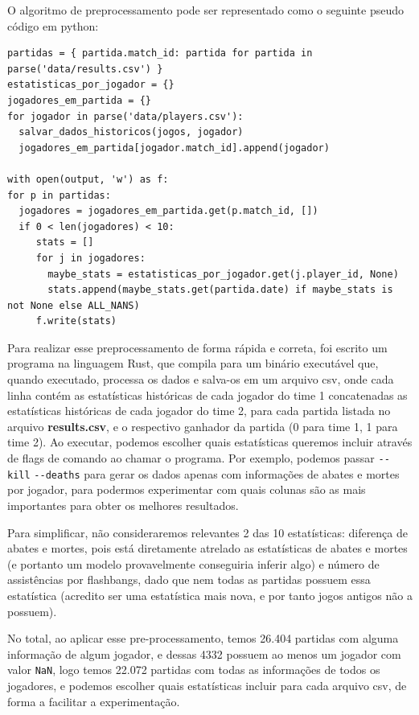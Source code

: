 \documentclass[12pt]{article}
\begin{document}
O algoritmo de preprocessamento pode ser representado como o seguinte pseudo código em python:
\begin{verbatim}
partidas = { partida.match_id: partida for partida in parse('data/results.csv') }
estatisticas_por_jogador = {}
jogadores_em_partida = {}
for jogador in parse('data/players.csv'):
  salvar_dados_historicos(jogos, jogador)
  jogadores_em_partida[jogador.match_id].append(jogador)

with open(output, 'w') as f:
for p in partidas:
  jogadores = jogadores_em_partida.get(p.match_id, [])
  if 0 < len(jogadores) < 10:
     stats = []
     for j in jogadores:
       maybe_stats = estatisticas_por_jogador.get(j.player_id, None)
       stats.append(maybe_stats.get(partida.date) if maybe_stats is not None else ALL_NANS)
     f.write(stats)
\end{verbatim}

Para realizar esse preprocessamento de forma rápida e correta, foi escrito um programa na linguagem Rust, que compila para um binário executável que, quando executado, processa os dados e salva-os em um arquivo csv, onde cada linha contém as estatísticas históricas de cada jogador do time 1 concatenadas as estatísticas históricas de cada jogador do time 2, para cada partida listada no arquivo \textbf{results.csv}, e o respectivo ganhador da partida (0 para time 1, 1 para time 2). Ao executar, podemos escolher quais estatísticas queremos incluir através de flags de comando ao chamar o programa. Por exemplo, podemos passar \verb+--kill+ \verb+--deaths+ para gerar os dados apenas com informações de abates e mortes por jogador, para podermos experimentar com quais colunas são as mais importantes para obter os melhores resultados.

Para simplificar, não consideraremos relevantes 2 das 10 estatísticas: diferença de abates e mortes, pois está diretamente atrelado as estatísticas de abates e mortes (e portanto um modelo provavelmente conseguiria inferir algo) e número de assistências por flashbangs, dado que nem todas as partidas possuem essa estatística (acredito ser uma estatística mais nova, e por tanto jogos antigos não a possuem).

No total, ao aplicar esse pre-processamento, temos 26.404 partidas com alguma informação de algum jogador, e dessas 4332 possuem ao menos um jogador com valor \verb+NaN+, logo temos 22.072 partidas com todas as informações de todos os jogadores, e podemos escolher quais estatísticas incluir para cada arquivo csv, de forma a facilitar a experimentação. 
\end{document}
